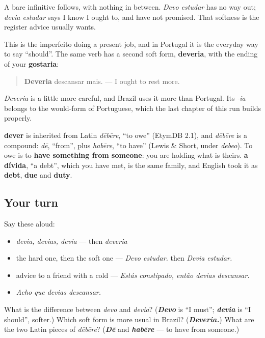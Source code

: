 A bare infinitive follows, with nothing in between. \emph{Devo estudar} has no way out; \emph{devia estudar} says I know I ought to, and have not promised. That softness is the register advice usually wants.

This is the imperfeito doing a present job, and in Portugal it is the everyday way to say \textquotedblleft{}should\textquotedblright{}. The same verb has a second soft form, \textbf{deveria}, with the ending of your \textbf{gostaria}:

\begin{quote}
\textbf{Deveria} descansar mais. — I ought to rest more.
\end{quote}

\emph{Deveria} is a little more careful, and Brazil uses it more than Portugal. Its \emph{-ia} belongs to the would-form of Portuguese, which the last chapter of this run builds properly.

\begin{cousinweb}
\textbf{dever} is inherited from Latin \emph{dēbēre}, \textquotedblleft{}to owe\textquotedblright{} (EtymDB 2.1), and \emph{dēbēre} is a compound: \emph{dē}, \textquotedblleft{}from\textquotedblright{}, plus \emph{habēre}, \textquotedblleft{}to have\textquotedblright{} (Lewis \& Short, under \emph{debeo}). To owe is to \textbf{have something from someone}: you are holding what is theirs. \textbf{a dívida}, \textquotedblleft{}a debt\textquotedblright{}, which you have met, is the same family, and English took it as \textbf{debt}, \textbf{due} and \textbf{duty}.
\end{cousinweb}

\subsection*{Your turn}
Say these aloud:

\begin{itemize}
\raggedright
  \item \emph{devia, devias, devia} — then \emph{deveria}
  \item the hard one, then the soft one — \emph{Devo estudar.} then \emph{Devia estudar.}
  \item advice to a friend with a cold — \emph{Estás constipado, então devias descansar.}
  \item \emph{Acho que devias descansar.}
\end{itemize}

\begin{tcolorbox}[breakable,colback=teal!4,colframe=teal!35!black,title={Before you move on}]
What is the difference between \emph{devo} and \emph{devia}? (\emph{\textbf{Devo}} is \textquotedblleft{}I must\textquotedblright{}; \emph{\textbf{devia}} is \textquotedblleft{}I should\textquotedblright{}, softer.) Which soft form is more usual in Brazil? (\emph{\textbf{Deveria.}}) What are the two Latin pieces of \emph{dēbēre}? (\emph{\textbf{Dē}} and \emph{\textbf{habēre}} — to have from someone.)
\end{tcolorbox}
